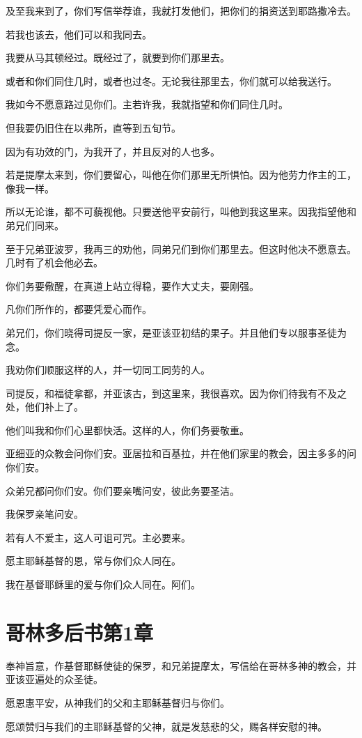 \documentclass[12pt,oneside]{book}
\begin{document}
及至我来到了，你们写信举荐谁，我就打发他们，把你们的捐资送到耶路撒冷去。

若我也该去，他们可以和我同去。

我要从马其顿经过。既经过了，就要到你们那里去。

或者和你们同住几时，或者也过冬。无论我往那里去，你们就可以给我送行。

我如今不愿意路过见你们。主若许我，我就指望和你们同住几时。

但我要仍旧住在以弗所，直等到五旬节。

因为有功效的门，为我开了，并且反对的人也多。

若是提摩太来到，你们要留心，叫他在你们那里无所惧怕。因为他劳力作主的工，像我一样。

所以无论谁，都不可藐视他。只要送他平安前行，叫他到我这里来。因我指望他和弟兄们同来。

至于兄弟亚波罗，我再三的劝他，同弟兄们到你们那里去。但这时他决不愿意去。几时有了机会他必去。

你们务要儆醒，在真道上站立得稳，要作大丈夫，要刚强。

凡你们所作的，都要凭爱心而作。

弟兄们，你们晓得司提反一家，是亚该亚初结的果子。并且他们专以服事圣徒为念。

我劝你们顺服这样的人，并一切同工同劳的人。

司提反，和福徒拿都，并亚该古，到这里来，我很喜欢。因为你们待我有不及之处，他们补上了。

他们叫我和你们心里都快活。这样的人，你们务要敬重。

亚细亚的众教会问你们安。亚居拉和百基拉，并在他们家里的教会，因主多多的问你们安。

众弟兄都问你们安。你们要亲嘴问安，彼此务要圣洁。

我保罗亲笔问安。

若有人不爱主，这人可诅可咒。主必要来。

愿主耶稣基督的恩，常与你们众人同在。

我在基督耶稣里的爱与你们众人同在。阿们。

\chapter{哥林多后书第1章}
奉神旨意，作基督耶稣使徒的保罗，和兄弟提摩太，写信给在哥林多神的教会，并亚该亚遍处的众圣徒。

愿恩惠平安，从神我们的父和主耶稣基督归与你们。

愿颂赞归与我们的主耶稣基督的父神，就是发慈悲的父，赐各样安慰的神。
\end{document}
